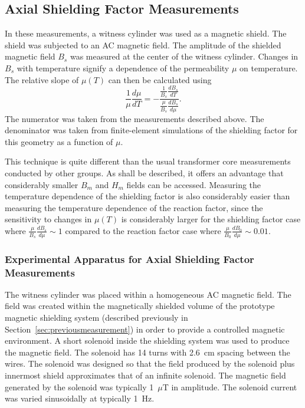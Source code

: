 
\subsection{Axial Shielding Factor Measurements\label{sec:axial}}


In these measurements, a witness cylinder was used as a magnetic
shield.  The shield was subjected to an AC magnetic field.  The
amplitude of the shielded magnetic field $B_s$ was measured at the
center of the witness cylinder.  Changes in $B_s$ with temperature
signify a dependence of the permeability $\mu$ on temperature.  The
relative slope of $\mu(T)$ can then be calculated using
\begin{equation}
\frac{1}{\mu}\frac{d\mu}{dT}=-\frac{\frac{1}{B_s}\frac{dB_s}{dT}}{\frac{\mu}{B_s}\frac{dB_s}{d\mu}}.
\label{eqn:axial}
\end{equation}
The numerator was taken from the measurements described above. The
denominator was taken from finite-element simulations of the shielding
factor for this geometry as a function of $\mu$.

This technique is quite different than the usual transformer core
measurements conducted by other groups.  As shall be described, it
offers an advantage that considerably smaller $B_m$ and $H_m$ fields
can be accessed.  Measuring the temperature dependence of the
shielding factor is also considerably easier than measuring the
temperature dependence of the reaction factor, since the sensitivity
to changes in $\mu(T)$ is considerably larger for the shielding factor
case where $\frac{\mu}{B_s}\frac{dB_s}{d\mu}\sim 1$ compared to the
reaction factor case where $\frac{\mu}{B_0}\frac{dB_0}{d\mu}\sim
0.01$.


\subsubsection{Experimental Apparatus for Axial Shielding Factor Measurements}

The witness cylinder was placed within a homogeneous AC magnetic
field.  The field was created within the magnetically shielded volume
of the prototype magnetic shielding system (described previously in
Section~\ref{sec:previousmeasurement}) in order to provide a
controlled magnetic environment.  A short solenoid inside the
shielding system was used to produce the magnetic field.
The solenoid has 14 turns with 2.6~cm spacing between the wires.  The
solenoid was designed so that the field produced by the solenoid plus
innermost shield approximates that of an infinite solenoid.  The
magnetic field generated by the solenoid was typically 1~$\mu$T in
amplitude.  The solenoid current was varied sinusoidally at typically
1~Hz.

